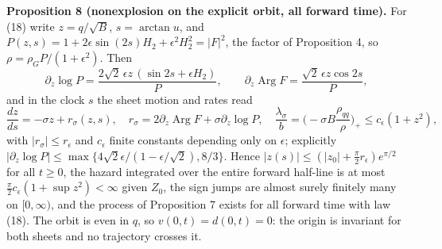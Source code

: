 \documentclass[11pt,a4paper]{article}
\begin{document}
\textbf{Proposition 8 (nonexplosion on the explicit orbit, all forward
time).} For (18) write \(z=q/\sqrt B\), \(s=\arctan u\), and
\(P(z,s)=1+2\epsilon\sin(2s)H_2+\epsilon^2H_2^2=|F|^2\), the factor of
Proposition 4, so \(\rho=\rho_GP/(1+\epsilon^2)\). Then
\[\partial_z\log P=\frac{2\sqrt2\,\epsilon z\,(\sin2s+\epsilon H_2)}{P},
\qquad
\partial_z\operatorname{Arg}F=\frac{\sqrt2\,\epsilon z\cos2s}{P},\tag{29}\]
and in the clock \(s\) the sheet motion and rates read
\[\frac{dz}{ds}=-\sigma z+r_\sigma(z,s),\quad
r_\sigma=2\partial_z\operatorname{Arg}F+\sigma\partial_z\log P,\quad
\frac{\lambda_\sigma}{b}=\Big(-\sigma B\frac{\rho_{qq}}{\rho}\Big)_+
\le c_\epsilon(1+z^2),\tag{30}\] with \(|r_\sigma|\le r_\epsilon\) and
\(c_\epsilon\) finite constants depending only on \(\epsilon\);
explicitly
\(|\partial_z\log P|\le\max\{4\sqrt2\epsilon/(1-\epsilon/\sqrt2),8/3\}\).
Hence \(|z(s)|\le(|z_0|+\tfrac\pi2r_\epsilon)e^{\pi/2}\) for all
\(t\ge0\), the hazard integrated over the entire forward half-line is at
most \(\tfrac\pi2c_\epsilon(1+\sup z^2)<\infty\) given \(Z_0\), the sign
jumps are almost surely finitely many on \([0,\infty)\), and the process
of Proposition 7 exists for all forward time with law (18). The orbit is
even in \(q\), so \(v(0,t)=d(0,t)=0\): the origin is invariant for both
sheets and no trajectory crosses it.
\end{document}
